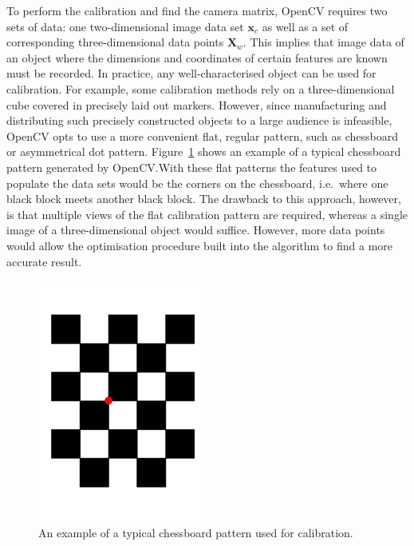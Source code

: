To perform the calibration and find the camera matrix, OpenCV requires two sets of data: one two-dimensional image data set $\bm{x}_c$ as well as a set of corresponding three-dimensional data points $\bm{X}_w$. This implies that image data of an object where the dimensions and coordinates of certain features are known must be recorded. In practice, any well-characterised object can be used for calibration. For example, some calibration methods rely on a three-dimensional cube covered in precisely laid out markers. However, since manufacturing and distributing such precisely constructed objects to a large audience is infeasible, OpenCV opts to use a more convenient flat, regular pattern, such as chessboard or asymmetrical dot pattern. Figure~\ref{fig:chap2-calib-pattern} shows an example of a typical chessboard pattern generated by OpenCV.\@ With these flat patterns the features used to populate the data sets would be the corners on the chessboard, i.e.\ where one black block meets another black block. The drawback to this approach, however, is that multiple views of the flat calibration pattern are required, whereas a single image of a three-dimensional object would suffice. However, more data points would allow the optimisation procedure built into the algorithm to find a more accurate result.  

\begin{figure}
  \centering
  \includegraphics[angle=90, width=0.5\textwidth]{figures/chapter2/chessboard_pattern}
  \caption{An example of a typical chessboard pattern used for calibration.}
\label{fig:chap2-calib-pattern}
\end{figure}

